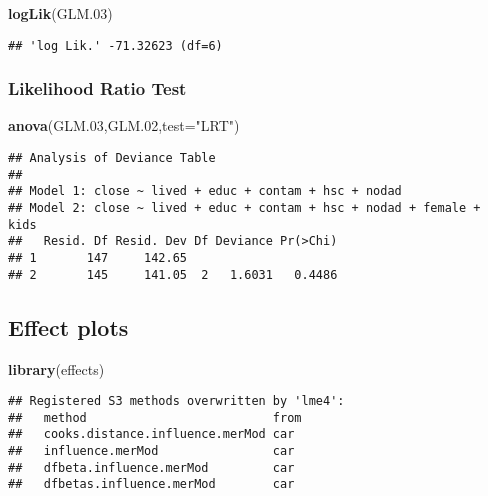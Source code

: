 \documentclass[
]{article}
\newenvironment{Shaded}{\begin{snugshade}}{\end{snugshade}}
\newcommand{\DataTypeTok}[1]{\textcolor[rgb]{0.13,0.29,0.53}{#1}}
\newcommand{\FloatTok}[1]{\textcolor[rgb]{0.00,0.00,0.81}{#1}}
\newcommand{\KeywordTok}[1]{\textcolor[rgb]{0.13,0.29,0.53}{\textbf{#1}}}
\newcommand{\NormalTok}[1]{#1}
\newcommand{\StringTok}[1]{\textcolor[rgb]{0.31,0.60,0.02}{#1}}
\begin{document}
\begin{Shaded}
\begin{Highlighting}[]
\KeywordTok{logLik}\NormalTok{(GLM}\FloatTok{.03}\NormalTok{)}
\end{Highlighting}
\end{Shaded}

\begin{verbatim}
## 'log Lik.' -71.32623 (df=6)
\end{verbatim}

\hypertarget{likelihood-ratio-test-1}{%
\subsubsection{Likelihood Ratio Test}\label{likelihood-ratio-test-1}}

\begin{Shaded}
\begin{Highlighting}[]
\KeywordTok{anova}\NormalTok{(GLM}\FloatTok{.03}\NormalTok{,GLM}\FloatTok{.02}\NormalTok{,}\DataTypeTok{test=}\StringTok{"LRT"}\NormalTok{)}
\end{Highlighting}
\end{Shaded}

\begin{verbatim}
## Analysis of Deviance Table
## 
## Model 1: close ~ lived + educ + contam + hsc + nodad
## Model 2: close ~ lived + educ + contam + hsc + nodad + female + kids
##   Resid. Df Resid. Dev Df Deviance Pr(>Chi)
## 1       147     142.65                     
## 2       145     141.05  2   1.6031   0.4486
\end{verbatim}

\hypertarget{effect-plots}{%
\subsection{Effect plots}\label{effect-plots}}

\begin{Shaded}
\begin{Highlighting}[]
\KeywordTok{library}\NormalTok{(effects)}
\end{Highlighting}
\end{Shaded}

\begin{verbatim}
## Registered S3 methods overwritten by 'lme4':
##   method                          from
##   cooks.distance.influence.merMod car 
##   influence.merMod                car 
##   dfbeta.influence.merMod         car 
##   dfbetas.influence.merMod        car
\end{verbatim}
\end{document}

